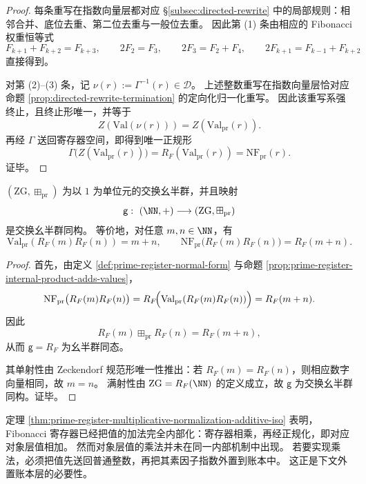 \begin{proof}
每条重写在指数向量层都对应 \S\ref{subsec:directed-rewrite} 中的局部规则：相邻合并、底位去重、第二位去重与一般位去重。
因此第 (1) 条由相应的 Fibonacci 权重恒等式
\[
F_{k+1}+F_{k+2}=F_{k+3},
\qquad
2F_2=F_3,
\qquad
2F_3=F_2+F_4,
\qquad
2F_{k+1}=F_{k-1}+F_{k+2}
\]
直接得到。

对第 (2)--(3) 条，记 \(\nu(r):=\Gamma^{-1}(r)\in\mathcal D\)。
上述整数重写在指数向量层恰对应命题 \ref{prop:directed-rewrite-termination} 的定向化归一化重写。
因此该重写系强终止，且终止形唯一，并等于
\[
Z(\mathrm{Val}(\nu(r)))=Z(\mathrm{Val}_{\mathrm{pr}}(r)).
\]
再经 \(\Gamma\) 送回寄存器空间，即得到唯一正规形
\[
\Gamma\bigl(Z(\mathrm{Val}_{\mathrm{pr}}(r))\bigr)
=R_F(\mathrm{Val}_{\mathrm{pr}}(r))
=\mathrm{NF}_{\mathrm{pr}}(r).
\]
证毕。
\end{proof}

\begin{theorem}[乘法归一化实现可加结构的严格同构]\label{thm:prime-register-multiplicative-normalization-additive-iso}
\((\mathrm{ZG},\boxplus_{\mathrm{pr}})\) 为以 \(1\) 为单位元的交换幺半群，并且映射
\[
\mathsf g:\ (\NN,+)\longrightarrow (\mathrm{ZG},\boxplus_{\mathrm{pr}})
\]
是交换幺半群同构。
等价地，对任意 \(m,n\in\NN\)，有
\[
\mathrm{Val}_{\mathrm{pr}}(R_F(m)R_F(n))=m+n,
\qquad
\mathrm{NF}_{\mathrm{pr}}\bigl(R_F(m)R_F(n)\bigr)=R_F(m+n).
\]
\end{theorem}

\begin{proof}
首先，由定义 \ref{def:prime-register-normal-form} 与命题 \ref{prop:prime-register-internal-product-adds-values}，
\[
\mathrm{NF}_{\mathrm{pr}}\bigl(R_F(m)R_F(n)\bigr)
=R_F\!\Bigl(\mathrm{Val}_{\mathrm{pr}}(R_F(m)R_F(n))\Bigr)
=R_F(m+n).
\]
因此
\[
R_F(m)\boxplus_{\mathrm{pr}}R_F(n)=R_F(m+n),
\]
从而 \(\mathsf g=R_F\) 为幺半群同态。

其单射性由 Zeckendorf 规范形唯一性推出：若 \(R_F(m)=R_F(n)\)，则相应数字向量相同，故 \(m=n\)。
满射性由 \(\mathrm{ZG}=R_F(\NN)\) 的定义成立，故 \(\mathsf g\) 为交换幺半群同构。证毕。
\end{proof}

\begin{remark}[加法的内部化与乘法的缺席]\label{rem:prime-register-addition-internalized}
定理 \ref{thm:prime-register-multiplicative-normalization-additive-iso} 表明，Fibonacci 寄存器已经把值的加法完全内部化：寄存器相乘，再经正规化，即对应对象层值相加。
然而对象层值的乘法并未在同一内部机制中出现。
若要实现乘法，必须把值先送回普通整数，再把其素因子指数外置到账本中。
这正是下文外置账本层的必要性。
\end{remark}

